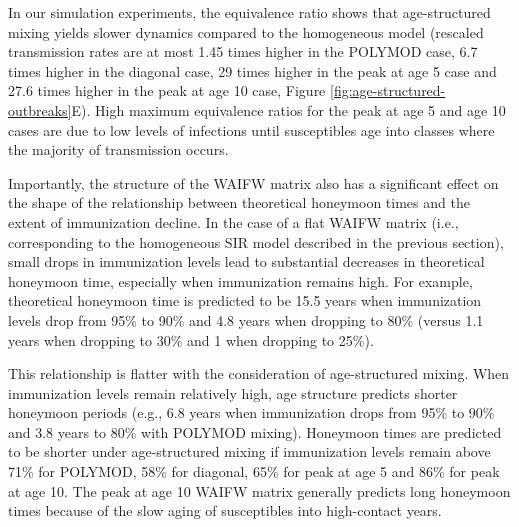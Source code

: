 In our simulation experiments, the equivalence ratio shows that age-structured mixing yields slower dynamics compared to the homogeneous model (rescaled transmission rates are at most 1.45 times higher in the POLYMOD case, 6.7 times higher in the diagonal case, 29 times higher in the peak at age 5 case and 27.6 times higher in the peak at age 10 case, Figure \ref{fig:age-structured-outbreaks}E). High maximum equivalence ratios for the peak at age 5 and age 10 cases are due to low levels of infections until susceptibles age into classes where the majority of transmission occurs. 

Importantly, the structure of the WAIFW matrix also has a significant effect on the shape of the relationship between theoretical honeymoon times and the extent of immunization decline. In the case of a flat WAIFW matrix (i.e., corresponding to the homogeneous SIR model described in the previous section), small drops in immunization levels lead to substantial decreases in theoretical honeymoon time, especially when immunization remains high. For example, theoretical honeymoon time is predicted to be 15.5 years when immunization levels drop from 95\% to 90\% and 4.8 years when dropping to 80\% (versus 1.1 years when dropping to 30\% and 1 when dropping to 25\%).

This relationship is flatter with the consideration of age-structured mixing. When immunization levels remain relatively high, age structure predicts shorter honeymoon periods (e.g., 6.8 years when immunization drops from 95\% to 90\% and 3.8 years to 80\% with POLYMOD mixing). Honeymoon times are predicted to be shorter under age-structured mixing if immunization levels remain above 71\% for POLYMOD, 58\% for diagonal, 65\% for peak at age 5 and 86\% for peak at age 10. The peak at age 10 WAIFW matrix generally predicts long honeymoon times because of the slow aging of susceptibles into high-contact years.


